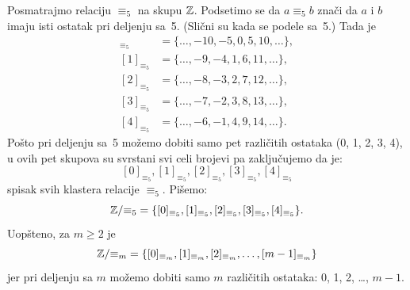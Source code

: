 \begin{EX}
  Posmatrajmo relaciju $\equiv_5$ na skupu $\mathbb{Z}$. Podsetimo se da $a \equiv_5 b$ zna\v ci da
  $a$ i $b$ imaju isti ostatak pri deljenju sa~5. (Sli\v cni su kada se podele sa~5.)
  Tada je
  \begin{align*}
    [0]_{\equiv_5} &= \{\ldots, -10, -5, 0, 5, 10, \ldots\},\\
    [1]_{\equiv_5} &= \{\ldots, -9, -4, 1, 6, 11, \ldots\},\\
    [2]_{\equiv_5} &= \{\ldots, -8, -3, 2, 7, 12, \ldots\},\\
    [3]_{\equiv_5} &= \{\ldots, -7, -2, 3, 8, 13, \ldots\},\\
    [4]_{\equiv_5} &= \{\ldots, -6, -1, 4, 9, 14, \ldots\}.
  \end{align*}
  Po\v sto pri deljenju sa~5 mo\v zemo dobiti samo pet razli\v citih ostataka (0, 1, 2, 3, 4), u ovih pet skupova
  su svrstani svi celi brojevi pa zaklju\v cujemo da je:
  $$
    [0]_{\equiv_5}, [1]_{\equiv_5}, [2]_{\equiv_5}, [3]_{\equiv_5}, [4]_{\equiv_5}
  $$
  spisak svih klastera relacije $\equiv_5$. Pi\v semo:
  $$
    \mathbb{Z} / \mbox{$\equiv_5$} = \{[0]_{\equiv_5}, [1]_{\equiv_5}, [2]_{\equiv_5}, [3]_{\equiv_5}, [4]_{\equiv_5}\}.
  $$
  Uop\v steno, za $m \ge 2$ je
  $$
    \mathbb{Z} / \mbox{$\equiv_m$} = \{[0]_{\equiv_m}, [1]_{\equiv_m}, [2]_{\equiv_m}, \ldots, [m-1]_{\equiv_m}\}
  $$
  jer pri deljenju sa $m$ mo\v zemo dobiti samo $m$ razli\v citih ostataka: 0, 1, 2, \ldots, $m-1$.
\end{EX}

